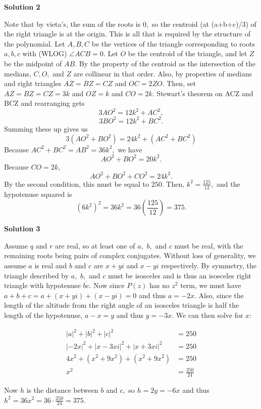 \begin{enumerate}
 



\textbf{Solution 2}

Note that by vieta's, the sum of the roots is $0,$ so the centroid (at (a+b+c)/3) of the right triangle is at the origin. This is all that is required by the structure of the polynomial. Let $A,B,C$ be the vertices of the triangle corresponding to roots $a,b,c$ with (WLOG) $\angle ACB=0.$ Let $O$ be the centroid of the triangle, and let $Z$ be the midpoint of $AB.$ By the property of the centroid as the intersection of the medians, $C,O,$ and $Z$ are collinear in that order. Also, by properties of medians and right triangles $AZ=BZ=CZ$ and $OC=2ZO.$ Then, set $AZ=BZ=CZ=3k$ and $OZ=k$ and $CO=2k.$ Stewart's theorem on ACZ and BCZ and rearranging gets
 \[3AO^2=12k^2+AC^2,\]
 \[3BO^2=12k^2+BC^2.\]Summing these up gives us 
 \[3(AO^2+BO^2)=24k^2+(AC^2+BC^2)\]Because $AC^2+BC^2=AB^2=36k^2,$ we have
 \[AO^2+BO^2=20k^2.\]Because $CO=2k,$
 \[AO^2+BO^2+CO^2=24k^2.\]By the second condition, this must be equal to $250.$ Then, $k^2=\frac{125}{12},$ and the hypotenuse squared is 
 \[(6k^2)^2=36k^2=36\left(\dfrac{125}{12}\right)=\boxed{375}.\]




\textbf{Solution 3}

Assume $q$ and $r$ are real, so at least one of $a,$ $b,$ and $c$ must be real, with the remaining roots being pairs of complex conjugates. Without loss of generality, we assume $a$ is real and $b$ and $c$ are $x + yi$ and $x - yi$ respectively. By symmetry, the triangle described by $a,$ $b,$ and $c$ must be isosceles and is thus an isosceles right triangle with hypotenuse $\overline{bc}.$ Now since $P(z)$ has no $z^2$ term, we must have $a+b+c = a + (x + yi) + (x - yi) = 0$ and thus $a = -2x.$ Also, since the length of the altitude from the right angle of an isosceles triangle is half the length of the hypotenuse, $a-x=y$ and thus $y=-3x.$ We can then solve for $x$:

 
 \begin{align*} |a|^2 + |b|^2 + |c|^2 &= 250\\ |-2x|^2 + |x-3xi|^2 + |x+3xi|^2 &= 250\\ 4x^2 + (x^2 + 9x^2) + (x^2 + 9x^2) &= 250\\ x^2 &= \frac{250}{24} \end{align*}


 Now $h$ is the distance between $b$ and $c,$ so $h = 2y = -6x$ and thus $h^2 = 36x^2 = 36 \cdot \frac{250}{24} = \boxed{375.}$





\end{enumerate}
